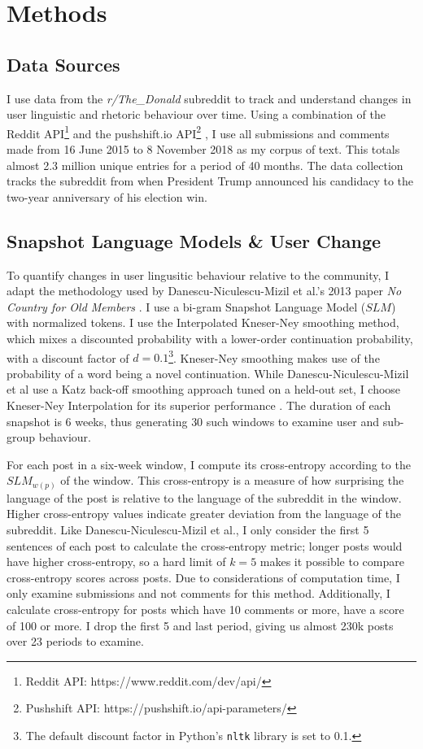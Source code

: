 \section{Methods}

\subsection*{Data Sources}

I use data from the \textit{r/The\_Donald} subreddit to track and understand changes in user linguistic and rhetoric behaviour over time. Using a combination of the Reddit API\footnote{Reddit API: https://www.reddit.com/dev/api/} and the pushshift.io API\footnote{Pushshift API: https://pushshift.io/api-parameters/} \citep{baumgartner_pushshift_2020}, I use all submissions and comments made from 16 June 2015 to 8 November 2018 as my corpus of text. This totals almost 2.3 million unique entries for a period of 40 months. The data collection tracks the subreddit from when President Trump announced his candidacy to the two-year anniversary of his election win. 

\subsection*{Snapshot Language Models \& User Change}

To quantify changes in user lingusitic behaviour relative to the community, I adapt the methodology used by Danescu-Niculescu-Mizil et al.'s 2013 paper \textit{No Country for Old Members} \citep{danescu-niculescu-mizil_no_2013}. I use a bi-gram Snapshot Language Model ($SLM$) with normalized tokens. I use the Interpolated Kneser-Ney smoothing method, which mixes a discounted probability with a lower-order continuation probability, with a discount factor of $d = 0.1$\footnote{The default discount factor in Python's \texttt{nltk} library is set to 0.1.}. Kneser-Ney smoothing makes use of the probability of a word being a novel continuation. While Danescu-Niculescu-Mizil et al use a Katz back-off smoothing approach tuned on a held-out set, I choose Kneser-Ney Interpolation for its superior performance \citep{jurafsky_speech_2008}. The duration of each snapshot is 6 weeks, thus generating $30$ such windows to examine user and sub-group behaviour.

For each post in a six-week window, I compute its cross-entropy according to the $SLM_{w(p)}$ of the window. This cross-entropy is a measure of how surprising the language of the post is relative to the language of the subreddit in the window. Higher cross-entropy values indicate greater deviation from the language of the subreddit.  Like Danescu-Niculescu-Mizil et al., I only consider the first 5 sentences of each post to calculate the cross-entropy metric; longer posts would have higher cross-entropy, so a hard limit of $k = 5$ makes it possible to compare cross-entropy scores across posts. Due to considerations of computation time, I only examine submissions and not comments for this method. Additionally, I calculate cross-entropy for posts which have 10 comments or more, have a score of 100 or more. I drop the first 5 and last period, giving us almost 230k posts over 23 periods to examine.

